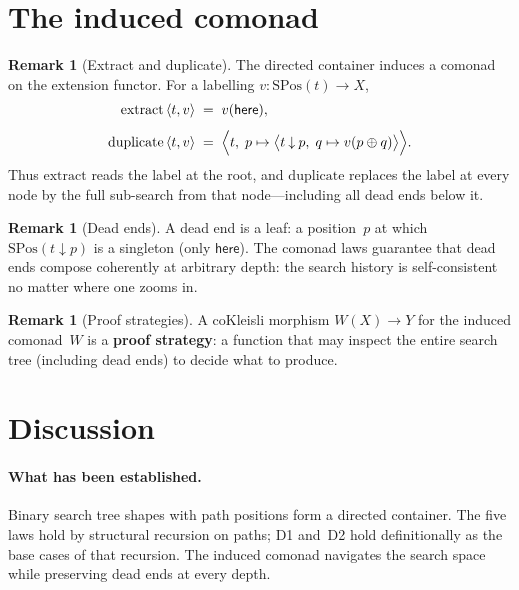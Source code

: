 \documentclass[11pt,a4paper]{article}
\theoremstyle{plain}
\theoremstyle{definition}
\newtheorem{remark}[theorem]{Remark}
\newcommand{\SPos}{\mathrm{SPos}}
\begin{document}
\section{The induced comonad}

\begin{remark}[Extract and duplicate]
The directed container induces a comonad on the extension functor. For a
labelling $v : \SPos(t) \to X$,
\begin{align}
  \mathrm{extract}\,\langle t, v \rangle
  &\;=\; v(\mathsf{here}), \\[4pt]
  \mathrm{duplicate}\,\langle t, v \rangle
  &\;=\;
  \Bigl\langle
    t,\;
    p \mapsto
    \bigl\langle
      t \mathbin{\downarrow} p,\;
      q \mapsto v(p \oplus q)
    \bigr\rangle
  \Bigr\rangle.
\end{align}
Thus $\mathrm{extract}$ reads the label at the root, and
$\mathrm{duplicate}$ replaces the label at every node by the full
sub-search from that node---including all dead ends below it.
\end{remark}

\begin{remark}[Dead ends]
A dead end is a leaf: a position~$p$ at which
$\SPos(t \mathbin{\downarrow} p)$ is a singleton (only $\mathsf{here}$).
The comonad laws guarantee that dead ends compose coherently at
arbitrary depth: the search history is self-consistent no matter where
one zooms in.
\end{remark}

\begin{remark}[Proof strategies]
A coKleisli morphism $W(X) \to Y$ for the induced comonad~$W$ is a
\textbf{proof strategy}: a function that may inspect the entire search
tree (including dead ends) to decide what to produce.
\end{remark}

\section{Discussion}

\paragraph{What has been established.}
Binary search tree shapes with path positions form a directed container.
The five laws hold by structural recursion on paths; D1 and~D2 hold
definitionally as the base cases of that recursion. The induced comonad
navigates the search space while preserving dead ends at every depth.
\end{document}
